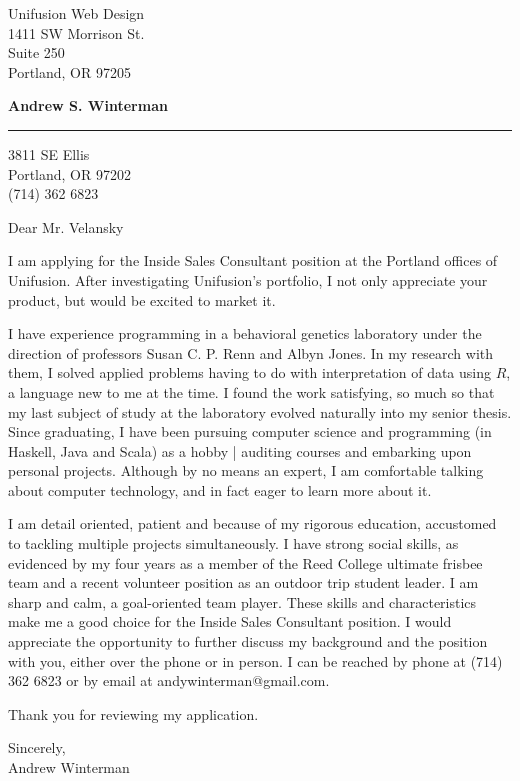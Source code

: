 \documentclass[11pt]{letter} %
\begin{document}
\longindentation=0pt                       %
\let\raggedleft\raggedright                %
 
\begin{letter}{
Unifusion Web Design \\
1411 SW Morrison St.\\
Suite 250 \\
Portland, OR 97205 \\ }

\begin{center}
\large \bf{Andrew S. Winterman} \end{center}
\medskip\hrule height 1pt
\begin{center}
3811 SE Ellis \\ Portland, OR 97202 \\ (714) 362 6823
\end{center}  



\opening{Dear Mr.  Velansky} 
 
 I am applying for the Inside Sales Consultant position at the Portland offices of Unifusion. After investigating Unifusion's portfolio, I not only appreciate your product, but would be excited to market it.

I have experience programming in a behavioral genetics laboratory under the direction of professors Susan C. P. Renn and Albyn Jones. In my research with them, I solved applied problems having to do with interpretation of data using $R$, a language new to me at the time. I found the work satisfying, so much so that my last subject of study at the laboratory evolved naturally into my senior thesis. Since graduating, I have been pursuing  computer science and programming (in Haskell, Java and Scala) as a hobby | auditing courses and embarking upon personal projects. Although by no means an expert, I am comfortable talking about computer technology, and in fact eager to learn more about it.
 
 I am detail oriented, patient and because of my rigorous education,  accustomed to tackling multiple projects simultaneously. I have strong social skills, as evidenced by my four years as a member of the Reed College ultimate frisbee team and a recent volunteer position as an outdoor trip student leader. I am sharp and calm, a goal-oriented team player. These skills and characteristics make me a good choice for the  Inside Sales Consultant position. I would appreciate the opportunity to further discuss my background and the position with you, either over the phone or in person. I can be reached by phone at (714) 362 6823 or by email at andywinterman@gmail.com. 

Thank you for reviewing my application.

Sincerely, \\
Andrew Winterman

\end{letter}
 
\end{document}
